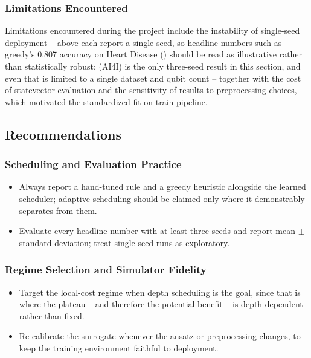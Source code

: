 \subsubsection{Limitations Encountered}
Limitations encountered during the project include the instability of single-seed deployment --  above each report a single seed, so headline numbers such as greedy's 0.807 accuracy on Heart Disease () should be read as illustrative rather than statistically robust;  (AI4I) is the only three-seed result in this section, and even that is limited to a single dataset and qubit count -- together with the cost of statevector evaluation and the sensitivity of results to preprocessing choices, which motivated the standardized fit-on-train pipeline.

\subsection{Recommendations}

\subsubsection{Scheduling and Evaluation Practice}
\begin{itemize}
\item Always report a hand-tuned rule and a greedy heuristic alongside the learned scheduler; adaptive scheduling should be claimed only where it demonstrably separates from them.
\item Evaluate every headline number with at least three seeds and report mean $\pm$ standard deviation; treat single-seed runs as exploratory.
\end{itemize}

\subsubsection{Regime Selection and Simulator Fidelity}
\begin{itemize}
\item Target the local-cost regime when depth scheduling is the goal, since that is where the plateau -- and therefore the potential benefit -- is depth-dependent rather than fixed.
\item Re-calibrate the surrogate whenever the ansatz or preprocessing changes, to keep the training environment faithful to deployment.
\end{itemize}


